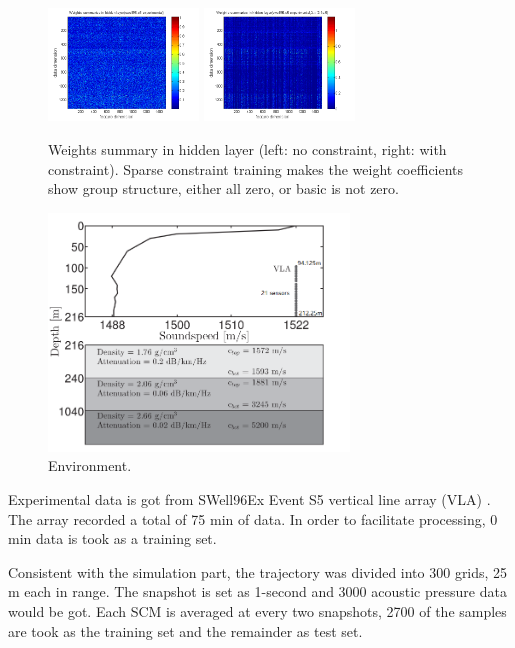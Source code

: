 \begin{figure}
\includegraphics[width=4cm,height=3cm]{figure/Weights_summaries_in_hidden_laye_swell_exp}
\includegraphics[width=4cm,height=3cm]{figure/Weights_summaries_in_hidden_layer_swell_exp_lambda_2_dot_1e_neg_5}
\caption{Weights summary in hidden layer (left: no constraint, right: with constraint). Sparse constraint
training makes the weight coefficients show group structure, either all zero, or basic is not zero.}
\end{figure}

\begin{figure}
\includegraphics[width=8cm]{figure/environment}
\caption{Environment.}
\end{figure}

Experimental data is got from SWell96Ex Event S5 vertical line array (VLA) . The array recorded a total of 75 min of data. In order to facilitate processing, 0 min data is took as a training set.

Consistent with the simulation part, the trajectory was divided into 300 grids, 25 m each in range. The snapshot is set as 1-second and 3000 acoustic pressure data would be got. Each SCM is averaged at every two snapshots, 2700 of the samples are took as the training set and the remainder as test set.

